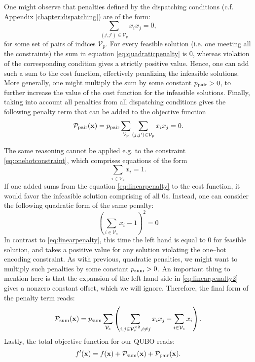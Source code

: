 One might observe that penalties defined by the dispatching conditions (c.f.
Appendix \ref{chapter:dispatching}) are of the form:
\begin{equation}
  \label{eq:quadraticpenalty}
  \sum_{(j, j') \in \mathcal{V}_{p}} x_{i}x_{j} = 0,
\end{equation}
for some set of pairs of indices $\mathcal{V}_{p}$. For every feasible solution
(i.e. one meeting all the constraints) the sum in equation
\eqref{eq:quadraticpenalty} is 0, whereas violation of the corresponding
condition gives a strictly positive value. Hence, one can add such a sum to the
cost function, effectively penalizing the infeasible solutions. More generally,
one might multiply the sum by some constant $p_{\text{pair}} > 0$, to further increase
the value of the cost function for the infeasible solutions. Finally, taking
into account all penalties from all dispatching conditions gives the
following penalty term that can be added to the objective function
\begin{equation}
\mathcal{P}_{\text{pair}}(\mathbf{x}) = p_{\text{pair}} \sum_{\mathcal{V}_{p}}\sum_{(j, j') \in \mathcal{V}_{p}} x_{i}x_{j} = 0.
\end{equation}

The same reasoning cannot be applied e.g. to the constraint
\eqref{eq:onehotconstraint}, which comprises equations of the form
\begin{equation}
  \label{eq:linearpenalty}
  \sum_{i \in \mathcal{V}_{s}}x_{i} = 1.
\end{equation}
If one added sums from the equation \eqref{eq:linearpenalty} to the cost
function, it would favor the infeasible solution comprising of all 0s. Instead,
one can consider the following quadratic form of the same penalty:
\begin{equation}
  \label{eq:linearpenalty2}
  \left(\sum_{i \in \mathcal{V}_{s}}x_{i} -1 \right)^{2} = 0
\end{equation}
In contrast to \eqref{eq:linearpenalty}, this time the left hand is equal to 0
for feasible solution, and takes a positive value for any solution violating the
one--hot encoding constraint. As with previous, quadratic penalties, we might
want to multiply such penalties by some constant $p_{\text{sum}} > 0$. An important
thing to mention here is that the expansion of the left-hand side in
\eqref{eq:linearpenalty2} gives a nonzero constant offset, which we will
ignore. Therefore, the final form of the penalty term reads:
\begin{equation}
  \mathcal{P}_{\text{sum}}(\mathbf{x}) = p_{\text{sum}} \sum_{\mathcal{V}_{s}}\left(\sum_{i,j \in \mathcal{V}_{s}^{\times 2}, i\ne j} x_{i}x_{j}  - \sum_{i \in \mathcal{V}_{s}}x_{i}\right).
\end{equation}
Lastly, the total objective function for our QUBO reads:
\begin{equation}
  f'(\mathbf{x}) = f(\mathbf{x}) + \mathcal{P}_{\text{sum}}(\mathbf{x}) + \mathcal{P}_{\text{pair}}(\mathbf{x}).
\end{equation}
